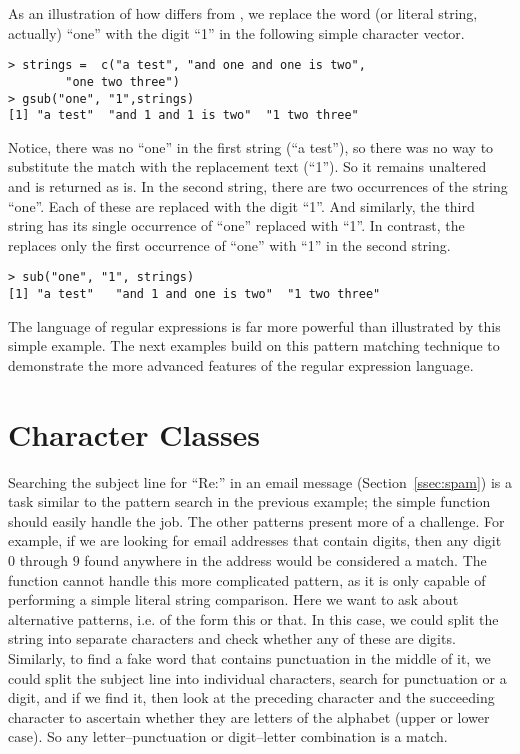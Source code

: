 As an illustration of how  differs from
, we replace the word (or literal string, actually)
``one'' with the digit ``1'' in the following simple character vector.
{\footnotesize{
\begin{verbatim}
> strings =  c("a test", "and one and one is two", 
        "one two three")
> gsub("one", "1",strings)
[1] "a test"  "and 1 and 1 is two"  "1 two three"       
\end{verbatim}
}}
\noindent 
Notice, there was no ``one'' in the first string (``a test''), so there was no way to substitute the match with the replacement text (``1'').  So it remains unaltered and is returned as is.  In the second string, there are two occurrences of the string ``one''.  Each of these are replaced with the digit ``1''.  And similarly, the third string has its single occurrence of ``one'' replaced with ``1''.  In contrast, the  replaces only the first occurrence of
    ``one'' with ``1'' in the second string.  
    {\footnotesize{
\begin{verbatim}
> sub("one", "1", strings)
[1] "a test"   "and 1 and one is two"  "1 two three"         
\end{verbatim}
}}

The language of regular expressions is far more powerful than
illustrated by this simple example.  The next examples build on this
pattern matching technique to demonstrate the more advanced features
of the regular expression language.


\section{Character Classes}

Searching the subject line for ``Re:'' in an email message
(Section~\ref{ssec:spam}) is a task similar to the pattern search in
the previous example; the simple function  should
easily handle the job.  The other patterns present more of a
challenge.  For example, if we are looking for email addresses that
contain digits, then any digit $0$ through $9$ found anywhere in the
address would be considered a match.  The function
 cannot handle this more complicated pattern, as
it is only capable of performing a simple literal string comparison.
Here we want to ask about alternative patterns, i.e. of the form this
or that. In this case, we could split the string into separate
characters and check whether any of these are digits.  Similarly, to
find a fake word that contains punctuation in the middle of it, we
could split the subject line into individual characters, search for
punctuation or a digit, and if we find it, then look at the preceding
character and the succeeding character to ascertain whether they are
letters of the alphabet (upper or lower case).  So any
letter--punctuation or digit--letter combination is a match.

